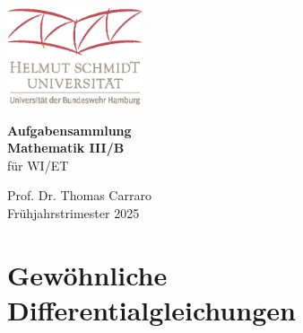 





\thispagestyle{empty} 
\begin{center}
    \vspace*{2cm}
    \includegraphics[width=0.3\textwidth]{HSU_RGB.eps} %
\end{center}

\begin{center}
    \vspace{1cm}
    {\LARGE \textbf{Aufgabensammlung}}\\
    \vspace{0.5cm}
    {\LARGE \textbf{Mathematik III/B}} \\
    \vspace{0.5cm}
    {\large f\"ur WI/ET} \\
\end{center}


\vfill
\begin{center}
    {\large Prof. Dr. Thomas Carraro} \\
    {\large Fr\"uhjahrstrimester 2025}
\end{center}

\newpage
\thispagestyle{empty}
\mbox{}
\newpage
\tableofcontents
\newpage
\thispagestyle{empty}
\mbox{}
\newpage



% 
\renewcommand{\d }{\mathrm{d}}
\setcounter{page}{1}

\section*{Gew\"ohnliche Differentialgleichungen}

\newpage
